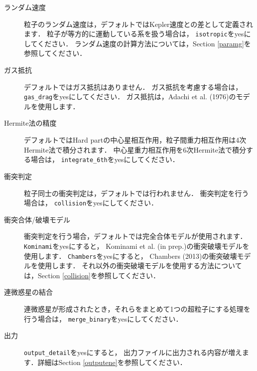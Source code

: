 \documentclass[12pt,a4paper,dvipdfmx]{jsarticle}
\begin{document}
\begin{description}
\item[ランダム速度]
粒子のランダム速度は，デフォルトではKepler速度との差として定義されます．
粒子が等方的に運動している系を扱う場合は，%
\texttt{isotropic}をyesにしてください．
ランダム速度の計算方法については，Section \ref{paramg}を参照してください．

\item[ガス抵抗]
デフォルトではガス抵抗はありません．
ガス抵抗を考慮する場合は，%
\texttt{gas\_drag}をyesにしてください．
ガス抵抗は，Adachi et al. (1976)のモデルを使用します．


\item[Hermite法の精度]
デフォルトではHard partの中心星相互作用，粒子間重力相互作用は4次Hermite法で積分されます．
中心星重力相互作用を6次Hermite法で積分する場合は，%
\texttt{integrate\_6th}をyesにしてください．

\item[衝突判定]
粒子同士の衝突判定は，デフォルトでは行われません．
衝突判定を行う場合は，%
\texttt{collision}をyesにしてください．

\item[衝突合体/破壊モデル]
衝突判定を行う場合，デフォルトでは完全合体モデルが使用されます．
\texttt{Kominami}をyesにすると，
Kominami et al. (in prep.)の衝突破壊モデルを使用します．
\texttt{Chambers}をyesにすると，
Chambers (2013)の衝突破壊モデルを使用します．
それ以外の衝突破壊モデルを使用する方法については，Section \ref{collision}を参照してください．

\item[連微惑星の結合]
連微惑星が形成されたとき，それらをまとめて1つの超粒子にする処理を行う場合は，
\texttt{merge\_binary}をyesにしてください．


\item[出力]
\texttt{output\_detail}をyesにすると，
出力ファイルに出力される内容が増えます．詳細はSection \ref{outputene}を参照してください．


\end{description}
\end{document}
